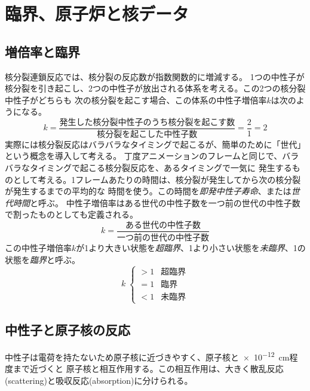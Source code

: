 \section{臨界、原子炉と核データ}

\subsection{増倍率と臨界}
核分裂連鎖反応では、核分裂の反応数が指数関数的に増減する。
1つの中性子が核分裂を引き起こし、2つの中性子が放出される体系を考える。この2つの核分裂中性子がどちらも
次の核分裂を起こす場合、この体系の中性子増倍率$k$は次のようになる。
\begin{equation}
  k = \frac{\text{発生した核分裂中性子のうち核分裂を起こす数}}{\text{核分裂を起こした中性子数}} = \frac{2}{1} = 2
\end{equation}
実際には核分裂反応はバラバラなタイミングで起こるが、簡単のために「世代」という概念を導入して考える。
丁度アニメーションのフレームと同じで、バラバラなタイミングで起こる核分裂反応を、あるタイミングで一気に
発生するものとして考える。1フレームあたりの時間は、核分裂が発生してから次の核分裂が発生するまでの平均的な
時間を使う。この時間を\emph{即発中性子寿命}、または\emph{世代時間}と呼ぶ。
中性子増倍率はある世代の中性子数を一つ前の世代の中性子数で割ったものとしても定義される。
\begin{equation}
  k = \frac{\text{ある世代の中性子数}}{\text{一つ前の世代の中性子数}}
\end{equation}
この中性子増倍率$k$が1より大きい状態を\emph{超臨界}、1より小さい状態を\emph{未臨界}、1の状態を\emph{臨界}と呼ぶ。
\[
k \; \left\{
  \begin{array}{ll}
    > 1 & \text{超臨界} \\
    = 1 & \text{臨界} \\
    < 1 & \text{未臨界}
  \end{array}
\right.
\]

\subsection{中性子と原子核の反応}
中性子は電荷を持たないため原子核に近づきやすく、原子核と\SI{e-12}{\centi\metre}程度まで近づくと
原子核と相互作用する。この相互作用は、大きく散乱反応(scattering)と吸収反応(absorption)に分けられる。

